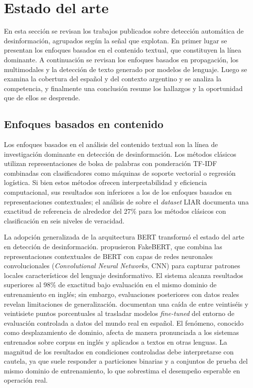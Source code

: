\section{Estado del arte}
\label{sec:estado-arte}

En esta sección se revisan los trabajos publicados sobre detección automática de desinformación, agrupados según la señal que explotan. En primer lugar se presentan los enfoques basados en el contenido textual, que constituyen la línea dominante. A continuación se revisan los enfoques basados en propagación, los multimodales y la detección de texto generado por modelos de lenguaje. Luego se examina la cobertura del español y del contexto argentino y se analiza la competencia, y finalmente una conclusión resume los hallazgos y la oportunidad que de ellos se desprende.

\subsection{Enfoques basados en contenido}

Los enfoques basados en el análisis del contenido textual son la línea de investigación dominante en detección de desinformación. Los métodos clásicos utilizan representaciones de bolsa de palabras con ponderación TF-IDF combinadas con clasificadores como máquinas de soporte vectorial o regresión logística. Si bien estos métodos ofrecen interpretabilidad y eficiencia computacional, sus resultados son inferiores a los de los enfoques basados en representaciones contextuales; el análisis de \textcite{Wang2017} sobre el \textit{dataset} LIAR documenta una exactitud de referencia de alrededor del 27\% para los métodos clásicos con clasificación en seis niveles de veracidad.

La adopción generalizada de la arquitectura BERT transformó el estado del arte en detección de desinformación. \textcite{KaliyarEtAl2021} propusieron FakeBERT, que combina las representaciones contextuales de BERT con capas de redes neuronales convolucionales (\textit{Convolutional Neural Networks}, CNN) para capturar patrones locales característicos del lenguaje desinformativo. El sistema alcanza resultados superiores al 98\% de exactitud bajo evaluación en el mismo dominio de entrenamiento en inglés; sin embargo, evaluaciones posteriores con datos reales revelan limitaciones de generalización. \textcite{BlancoFernandezEtAl2024} documentan una caída de entre veintiséis y veintisiete puntos porcentuales al trasladar modelos \textit{fine-tuned} del entorno de evaluación controlada a datos del mundo real en español. El fenómeno, conocido como desplazamiento de dominio, afecta de manera pronunciada a los sistemas entrenados sobre corpus en inglés y aplicados a textos en otras lenguas. La magnitud de los resultados en condiciones controladas debe interpretarse con cautela, ya que suele responder a particiones binarias y a conjuntos de prueba del mismo dominio de entrenamiento, lo que sobrestima el desempeño esperable en operación real.

